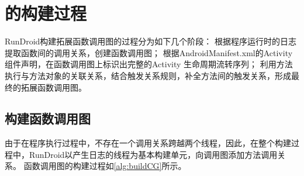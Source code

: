 {\begin{table}[!ht]
{\begin{threeparttable}[b]
\begin{tabular}{|l|c|}
				
				
				
			\end{tabular}
			
			
		\end{threeparttable}
	}
\end{table}
}
\section{\ecg 的构建过程}

RunDroid构建拓展函数调用图的过程分为如下几个阶段：
根据程序运行时的日志提取函数间的调用关系，创建函数调用图；
根据AndroidManifest.xml的Activity组件声明，在函数调用图上标识出完整的Activity 生命周期流转序列；
利用方法执行与方法对象的关联关系，结合触发关系规则，补全方法间的触发关系，形成最终的拓展函数调用图。



\subsection{构建函数调用图}


由于在程序执行过程中，不存在一个调用关系跨越两个线程，因此，在整个构建过程中，RunDroid以产生日志的线程为基本构建单元，向调用图添加方法调用关系。
函数调用图的构建过程如\autoref{alg:buildCG}所示。


